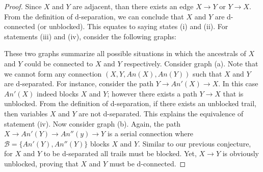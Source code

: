 \documentclass{amsart}
\theoremstyle{plain}
\begin{document}
\begin{proof}
  Since $X$ and $Y$ are adjacent, than there exists an edge $X\rightarrow Y$ or $Y\rightarrow X$.
  From the definition of d-separation, we can conclude that $X$ and $Y$ are d-connected (or
  unblocked). This equates to saying states (i) and (ii). For statements (iii) and (iv), consider
  the following graphs:

  \begin{figure}[h]
  \end{figure}

  These two graphs summarize all possible situations in which the ancestrals of $X$ and $Y$ could
  be connected to $X$ and $Y$ respectively. Consider graph (a). Note that we cannot form any
  connection $(X,Y,An(X),An(Y))$ such that $X$ and $Y$ are d-separated. For instance, consider the
  path $Y\rightarrow An'(X)\rightarrow X$. In this case $An'(X)$ indeed blocks $X$ and $Y$; however
  there exists a path $Y\rightarrow X$ that is unblocked. From the definition of d-separation, if
  there exists an unblocked trail, then variables $X$ and $Y$ are not d-separated. This explains
  the equivalence of statement (iv). Now consider graph (b). Again, the path $X\rightarrow An'(Y)
  \rightarrow An''(y)\rightarrow Y$ is a serial connection where $\mathcal{B}=\{An'(Y),An''(Y)\}$
  blocks $X$ and $Y$. Similar to our previous conjecture, for $X$ and $Y$ to be d-separated all
  trails must be blocked. Yet, $X\rightarrow Y$ is obviously unblocked, proving that $X$ and $Y$
  must be d-connected.


\end{proof}
\end{document}
